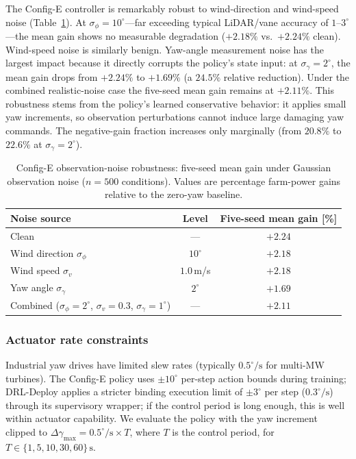 \documentclass[final,5p,times]{elsarticle}
\begin{document}
The Config-E controller is remarkably robust to wind-direction and wind-speed noise (Table~\ref{tab:noise_robustness}). At $\sigma_\phi{=}10^\circ$---far exceeding typical LiDAR/vane accuracy of $1$--$3^\circ$---the mean gain shows no measurable degradation ($+2.18\%$ vs.\ $+2.24\%$ clean). Wind-speed noise is similarly benign. Yaw-angle measurement noise has the largest impact because it directly corrupts the policy's state input: at $\sigma_\gamma{=}2^\circ$, the mean gain drops from $+2.24\%$ to $+1.69\%$ (a $24.5\%$ relative reduction). Under the combined realistic-noise case the five-seed mean gain remains at $+2.11\%$. This robustness stems from the policy's learned conservative behavior: it applies small yaw increments, so observation perturbations cannot induce large damaging yaw commands. The negative-gain fraction increases only marginally (from $20.8\%$ to $22.6\%$ at $\sigma_\gamma{=}2^\circ$).



\begin{table}[h]
\centering
\caption{Config-E observation-noise robustness: five-seed mean gain under Gaussian observation noise ($n{=}500$ conditions). Values are percentage farm-power gains relative to the zero-yaw baseline.}
\label{tab:noise_robustness}
\small
\begin{tabular}{lcc}
\toprule
Noise source & Level & Five-seed mean gain [\%] \\
\midrule
Clean & --- & $+2.24$ \\
Wind direction $\sigma_\phi$ & $10^\circ$ & $+2.18$ \\
Wind speed $\sigma_v$       & $1.0$\,m/s & $+2.18$ \\
Yaw angle $\sigma_\gamma$   & $2^\circ$ & $+1.69$ \\
Combined ($\sigma_\phi{=}2^\circ$, $\sigma_v{=}0.3$, $\sigma_\gamma{=}1^\circ$) & --- & $+2.11$ \\
\bottomrule
\end{tabular}
\end{table}

\subsubsection{Actuator rate constraints}
Industrial yaw drives have limited slew rates (typically $0.5^\circ/\mathrm{s}$ for multi-MW turbines). The Config-E policy uses $\pm10^\circ$ per-step action bounds during training; DRL-Deploy applies a stricter binding execution limit of $\pm3^\circ$ per step ($0.3^\circ\!/\!\mathrm{s}$) through its supervisory wrapper; if the control period is long enough, this is well within actuator capability. We evaluate the policy with the yaw increment clipped to $\Delta\gamma_\mathrm{max}\!=\!0.5^\circ\!/\mathrm{s}\!\times\!T$, where $T$ is the control period, for $T\!\in\!\{1,5,10,30,60\}\,\mathrm{s}$.
\end{document}
